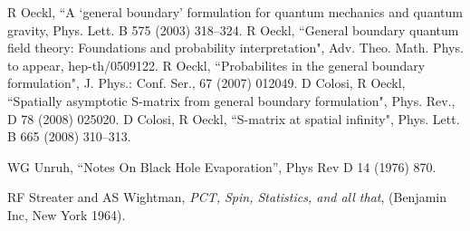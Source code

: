 \documentclass[10pt, nofootinbib]{revtex4}
\begin{document}
\begin{thebibliography}{9}
 R Oeckl, ``A `general boundary' formulation for quantum mechanics and
 quantum gravity, Phys. Lett. B 575 (2003) 318--324.
R Oeckl,
``General boundary quantum field theory: Foundations and probability 
interpretation", Adv. Theo. Math. Phys. to appear,  hep-th/0509122.
R Oeckl, ``Probabilites in the general boundary formulation", J. Phys.: Conf. Ser.,
67 (2007) 012049.
D Colosi, R Oeckl, 
``Spatially asymptotic S-matrix from general boundary formulation",
Phys. Rev., D 78 (2008) 025020. 
D Colosi, R Oeckl, ``S-matrix at 
spatial infinity", Phys. Lett. B 665 (2008) 310--313.
  
   WG Unruh, ``Notes On Black Hole Evaporation'', 
Phys Rev D {14} (1976) 870.


RF Streater and AS Wightman, {\em PCT, Spin, Statistics, and all that}, (Benjamin Inc, New York 1964).

\end{thebibliography}
\end{document}
